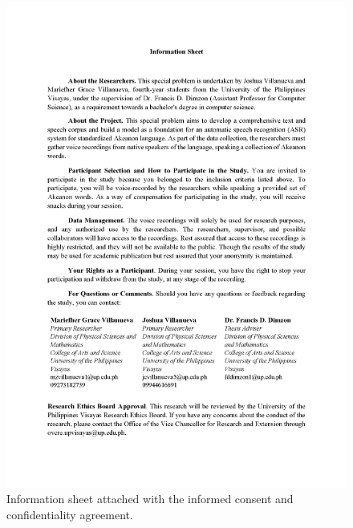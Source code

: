 \begin{figure}[h!]
    \centering
    \includegraphics[width=\textwidth]{./appendix/informed-consent-3.png}
    \caption{Information sheet attached with the informed consent and confidentiality agreement.}
    \label{fig:infoSheet}
\end{figure}
